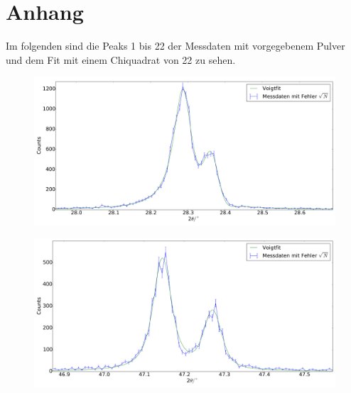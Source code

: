 \section{Anhang}
Im folgenden sind die Peaks 1 bis 22 der Messdaten mit vorgegebenem Pulver und dem Fit mit einem Chiquadrat von 22 zu sehen.
\begin{figure}[H]
\begin{minipage}{.52\textwidth}
  \centering
  \includegraphics[scale=0.18]{messung_pulver_1}
  \label{fig:pul_mess_1}
\end{minipage}
\hspace{0.2cm}
\begin{minipage}{.52\textwidth}
  \centering
  \includegraphics[scale=0.18]{messung_pulver_2}
  \label{fig:pul_mess_2}
\end{minipage}
\end{figure}
